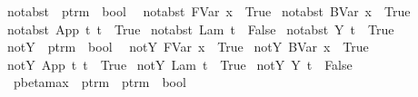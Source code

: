 \begin{isabellebody}
\ not{\isacharunderscore}abst\ {\isacharcolon}{\isacharcolon}\ {\isachardoublequoteopen}ptrm\ {\isasymRightarrow}\ bool{\isachardoublequoteclose}\isanewline
{}\isanewline
\ \ {\isachardoublequoteopen}not{\isacharunderscore}abst\ {\isacharparenleft}FVar\ x{\isacharparenright}\ {\isacharequal}\ True{\isachardoublequoteclose}\isanewline
{\isacharbar}\ {\isachardoublequoteopen}not{\isacharunderscore}abst\ {\isacharparenleft}BVar\ x{\isacharparenright}\ {\isacharequal}\ True{\isachardoublequoteclose}\isanewline
{\isacharbar}\ {\isachardoublequoteopen}not{\isacharunderscore}abst\ {\isacharparenleft}App\ t{}\ t{}{\isacharparenright}\ {\isacharequal}\ True{\isachardoublequoteclose}\isanewline
{\isacharbar}\ {\isachardoublequoteopen}not{\isacharunderscore}abst\ {\isacharparenleft}Lam\ t{\isacharparenright}\ {\isacharequal}\ False{\isachardoublequoteclose}\isanewline
{\isacharbar}\ {\isachardoublequoteopen}not{\isacharunderscore}abst\ {\isacharparenleft}Y\ t{\isacharparenright}\ {\isacharequal}\ True{\isachardoublequoteclose}\isanewline
\isanewline
{}\isamarkupfalse%
\ not{\isacharunderscore}Y\ {\isacharcolon}{\isacharcolon}\ {\isachardoublequoteopen}ptrm\ {\isasymRightarrow}\ bool{\isachardoublequoteclose}\isanewline
{}\isanewline
\ \ {\isachardoublequoteopen}not{\isacharunderscore}Y\ {\isacharparenleft}FVar\ x{\isacharparenright}\ {\isacharequal}\ True{\isachardoublequoteclose}\isanewline
{\isacharbar}\ {\isachardoublequoteopen}not{\isacharunderscore}Y\ {\isacharparenleft}BVar\ x{\isacharparenright}\ {\isacharequal}\ True{\isachardoublequoteclose}\isanewline
{\isacharbar}\ {\isachardoublequoteopen}not{\isacharunderscore}Y\ {\isacharparenleft}App\ t{}\ t{}{\isacharparenright}\ {\isacharequal}\ True{\isachardoublequoteclose}\isanewline
{\isacharbar}\ {\isachardoublequoteopen}not{\isacharunderscore}Y\ {\isacharparenleft}Lam\ t{\isacharparenright}\ {\isacharequal}\ True{\isachardoublequoteclose}\isanewline
{\isacharbar}\ {\isachardoublequoteopen}not{\isacharunderscore}Y\ {\isacharparenleft}Y\ t{\isacharparenright}\ {\isacharequal}\ False{\isachardoublequoteclose}\isanewline
\isanewline
{}\isamarkupfalse%
\ \isanewline
\ \ pbeta{\isacharunderscore}max\ {\isacharcolon}{\isacharcolon}\ {\isachardoublequoteopen}ptrm\ {\isasymRightarrow}\ ptrm\ {\isasymRightarrow}\ bool{\isachardoublequoteclose}\ {\isacharparenleft}{\isachardoublequoteopen}{\isacharunderscore}\ {\isachargreater}{\isachargreater}{\isachargreater}\ {\isacharunderscore}{\isachardoublequoteclose}\ {\isacharbrackleft}{}{}{\isacharcomma}{}{}{\isacharbrackright}\ {}{}{\isacharparenright}\isanewline

\end{isabellebody}
